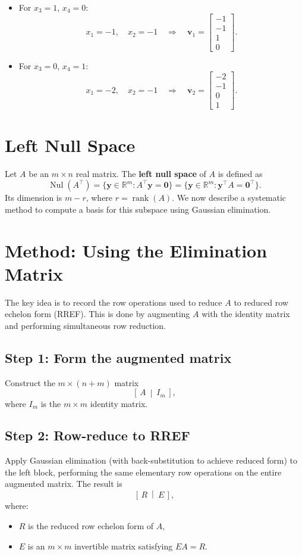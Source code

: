 \documentclass{article}
\begin{document}
\begin{itemize}
\item For $x_3 = 1$, $x_4 = 0$:
    \[
    x_1 = -1,\quad x_2 = -1 \quad \Rightarrow \quad
    \mathbf{v}_1 = \begin{bmatrix} -1 \\ -1 \\ 1 \\ 0 \end{bmatrix}.
    \]
    \item For $x_3 = 0$, $x_4 = 1$:
    \[
    x_1 = -2,\quad x_2 = -1 \quad \Rightarrow \quad
    \mathbf{v}_2 = \begin{bmatrix} -2 \\ -1 \\ 0 \\ 1 \end{bmatrix}.
    \]
\end{itemize}


\section*{Left Null Space}

Let $A$ be an $m \times n$ real matrix. The \textbf{left null space} of $A$ is defined as
\[
\operatorname{Nul}(A^\top) = \{ \mathbf{y} \in \mathbb{R}^m : A^\top \mathbf{y} = \mathbf{0} \}
= \{ \mathbf{y} \in \mathbb{R}^m : \mathbf{y}^\top A = \mathbf{0}^\top \}.
\]
Its dimension is $m - r$, where $r = \operatorname{rank}(A)$. We now describe a systematic method to compute a basis for this subspace using Gaussian elimination.

\section*{Method: Using the Elimination Matrix}

The key idea is to record the row operations used to reduce $A$ to reduced row echelon form (RREF). This is done by augmenting $A$ with the identity matrix and performing simultaneous row reduction.

\subsection*{Step 1: Form the augmented matrix}
Construct the $m \times (n + m)$ matrix
\[
\left[\, A \ \middle|\ I_m \,\right],
\]
where $I_m$ is the $m \times m$ identity matrix.

\subsection*{Step 2: Row-reduce to RREF}
Apply Gaussian elimination (with back-substitution to achieve reduced form) to the left block, performing the same elementary row operations on the entire augmented matrix. The result is
\[
\left[\, R \ \middle|\ E \,\right],
\]
where:
\begin{itemize}
\item $R$ is the reduced row echelon form of $A$,
    \item $E$ is an $m \times m$ invertible matrix satisfying $EA = R$.
\end{itemize}
\end{document}
